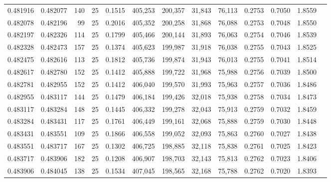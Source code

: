 \begin{tabular}{rrrrrrrrrrrrr}
0.481916 & 0.482077 &   140 &  25 &                                     0.1515 & 405,253 & 200,357 &  31,843 &  76,113 & 0.2753 & 0.7050 & 1.8559 \\
0.482078 & 0.482196 &    99 &  25 &                                     0.2016 & 405,352 & 200,258 &  31,868 &  76,088 & 0.2753 & 0.7048 & 1.8550 \\
0.482197 & 0.482326 &   114 &  25 &                                     0.1799 & 405,466 & 200,144 &  31,893 &  76,063 & 0.2754 & 0.7046 & 1.8539 \\
0.482328 & 0.482473 &   157 &  25 &                                     0.1374 & 405,623 & 199,987 &  31,918 &  76,038 & 0.2755 & 0.7043 & 1.8525 \\
0.482475 & 0.482616 &   113 &  25 &                                     0.1812 & 405,736 & 199,874 &  31,943 &  76,013 & 0.2755 & 0.7041 & 1.8514 \\
0.482617 & 0.482780 &   152 &  25 &                                     0.1412 & 405,888 & 199,722 &  31,968 &  75,988 & 0.2756 & 0.7039 & 1.8500 \\
0.482781 & 0.482955 &   152 &  25 &                                     0.1412 & 406,040 & 199,570 &  31,993 &  75,963 & 0.2757 & 0.7036 & 1.8486 \\
0.482955 & 0.483117 &   144 &  25 &                                     0.1479 & 406,184 & 199,426 &  32,018 &  75,938 & 0.2758 & 0.7034 & 1.8473 \\
0.483117 & 0.483284 &   148 &  25 &                                     0.1445 & 406,332 & 199,278 &  32,043 &  75,913 & 0.2759 & 0.7032 & 1.8459 \\
0.483284 & 0.483431 &   117 &  25 &                                     0.1761 & 406,449 & 199,161 &  32,068 &  75,888 & 0.2759 & 0.7030 & 1.8448 \\
0.483431 & 0.483551 &   109 &  25 &                                     0.1866 & 406,558 & 199,052 &  32,093 &  75,863 & 0.2760 & 0.7027 & 1.8438 \\
0.483551 & 0.483717 &   167 &  25 &                                     0.1302 & 406,725 & 198,885 &  32,118 &  75,838 & 0.2761 & 0.7025 & 1.8423 \\
0.483717 & 0.483906 &   182 &  25 &                                     0.1208 & 406,907 & 198,703 &  32,143 &  75,813 & 0.2762 & 0.7023 & 1.8406 \\
0.483906 & 0.484045 &   138 &  25 &                                     0.1534 & 407,045 & 198,565 &  32,168 &  75,788 & 0.2762 & 0.7020 & 1.8393 \\

\end{tabular}
